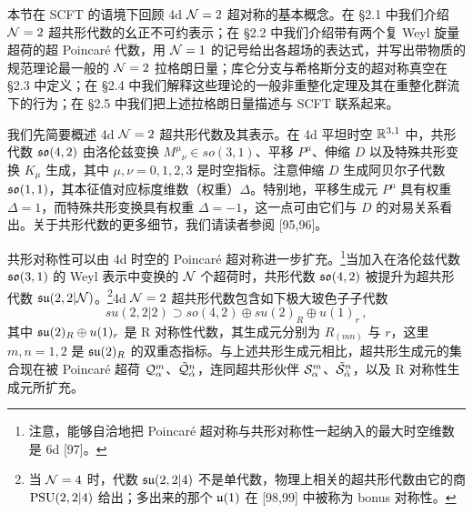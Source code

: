 

本节在 SCFT 的语境下回顾 4d $\mathcal{N}=2$ 超对称的基本概念。在 §2.1 中我们介绍 $\mathcal{N}=2$ 超共形代数的幺正不可约表示；在 §2.2 中我们介绍带有两个复 Weyl 旋量超荷的超 Poincaré 代数，用 $\mathcal{N}=1$ 的记号给出各超场的表达式，并写出带物质的规范理论最一般的 $\mathcal{N}=2$ 拉格朗日量；库仑分支与希格斯分支的超对称真空在 §2.3 中定义；在 §2.4 中我们解释这些理论的一般非重整化定理及其在重整化群流下的行为；在 §2.5 中我们把上述拉格朗日量描述与 SCFT 联系起来。


我们先简要概述 4d $\mathcal{N}=2$ 超共形代数及其表示。在 4d 平坦时空 $\mathbb{R}^{3,1}$ 中，共形代数 $\mathfrak{so}(4,2)$ 由洛伦兹变换 $M^\mu{}_\nu\in so(3,1)$、平移 $P^\mu$、伸缩 $D$ 以及特殊共形变换 $K_\mu$ 生成，其中 $\mu,\nu=0,1,2,3$ 是时空指标。注意伸缩 $D$ 生成阿贝尔子代数 $\mathfrak{so}(1,1)$，其本征值对应标度维数（权重）$\Delta$。特别地，平移生成元 $P^\mu$ 具有权重 $\Delta=1$，而特殊共形变换具有权重 $\Delta=-1$，这一点可由它们与 $D$ 的对易关系看出。关于共形代数的更多细节，我们请读者参阅 [95,96]。

共形对称性可以由 4d 时空的 Poincaré 超对称进一步扩充。\footnote{注意，能够自洽地把 Poincaré 超对称与共形对称性一起纳入的最大时空维数是 6d [97]。}当加入在洛伦兹代数 $\mathfrak{so}(3,1)$ 的 Weyl 表示中变换的 $\mathcal{N}$ 个超荷时，共形代数 $\mathfrak{so}(4,2)$ 被提升为超共形代数 $\mathfrak{su}(2,2|\mathcal{N})$。\footnote{当 $\mathcal{N}=4$ 时，代数 $\mathfrak{su}(2,2|4)$ 不是单代数，物理上相关的超共形代数由它的商 $\mathrm{PSU}(2,2|4)$ 给出；多出来的那个 $\mathfrak{u}(1)$ 在 [98,99] 中被称为 bonus 对称性。}4d $\mathcal{N}=2$ 超共形代数包含如下极大玻色子子代数
\begin{equation}
  su(2,2|2)\supset so(4,2)\oplus su(2)_R\oplus u(1)_r\,,
  \tag{2.1}
\end{equation}
其中 $\mathfrak{su}(2)_R\oplus u(1)_r$ 是 R 对称性代数，其生成元分别为 $R_{(mn)}$ 与 $r$，这里 $m,n=1,2$ 是 $\mathfrak{su}(2)_R$ 的双重态指标。与上述共形生成元相比，超共形生成元的集合现在被 Poincaré 超荷 $\mathcal{Q}^m_\alpha$、$\tilde{\mathcal{Q}}^n_{\dot\alpha}$，连同超共形伙伴 $\mathcal{S}^m_\alpha$、$\tilde{\mathcal{S}}^n_{\dot\alpha}$，以及 R 对称性生成元所扩充。


